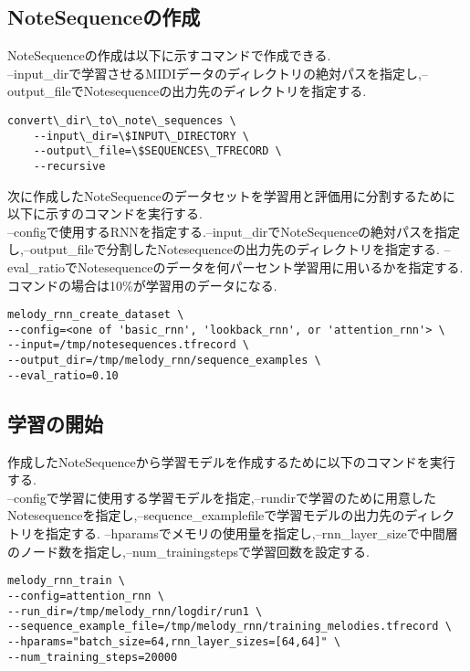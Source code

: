 \subsection{NoteSequenceの作成}
NoteSequenceの作成は以下に示すコマンドで作成できる.\\
--input\_dirで学習させるMIDIデータのディレクトリの絶対パスを指定し,--output\_fileでNotesequenceの出力先のディレクトリを指定する.\\
\begin{lstlisting}[basicstyle=\ttfamily\footnotesize,frame=single]
    convert\_dir\_to\_note\_sequences \
    --input\_dir=\$INPUT\_DIRECTORY \
    --output\_file=\$SEQUENCES\_TFRECORD \
    --recursive
\end{lstlisting}
次に作成したNoteSequenceのデータセットを学習用と評価用に分割するために以下に示すのコマンドを実行する.\\
--configで使用するRNNを指定する.--input\_dirでNoteSequenceの絶対パスを指定し,--output\_fileで分割したNotesequenceの出力先のディレクトリを指定する.
--eval\_ratioでNotesequenceのデータを何パーセント学習用に用いるかを指定する.コマンドの場合は10\%が学習用のデータになる.
\begin{lstlisting}[basicstyle=\ttfamily\footnotesize,frame=single]
melody_rnn_create_dataset \
--config=<one of 'basic_rnn', 'lookback_rnn', or 'attention_rnn'> \
--input=/tmp/notesequences.tfrecord \
--output_dir=/tmp/melody_rnn/sequence_examples \
--eval_ratio=0.10
\end{lstlisting}
\subsection{学習の開始}
作成したNoteSequenceから学習モデルを作成するために以下のコマンドを実行する.\\
--configで学習に使用する学習モデルを指定,--rundirで学習のために用意したNotesequenceを指定し,--sequence\_examplefileで学習モデルの出力先のディレクトリを指定する.
--hparamsでメモリの使用量を指定し,--rnn\_layer\_sizeで中間層のノード数を指定し,--num\_trainingstepsで学習回数を設定する.\\
\begin{lstlisting}[basicstyle=\ttfamily\footnotesize,frame=single]
melody_rnn_train \
--config=attention_rnn \
--run_dir=/tmp/melody_rnn/logdir/run1 \
--sequence_example_file=/tmp/melody_rnn/training_melodies.tfrecord \
--hparams="batch_size=64,rnn_layer_sizes=[64,64]" \
--num_training_steps=20000
\end{lstlisting}
